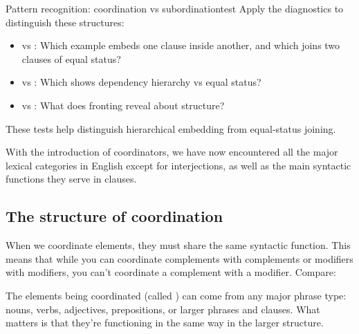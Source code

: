 \begin{tblsframedsymbol}{Pattern recognition: coordination vs subordination}{test}
Apply the diagnostics to distinguish these structures:
\begin{itemize}[noitemsep, leftmargin=*]
    \item {} vs : Which example embeds one clause inside another, and which joins two clauses of equal status?
    \item {} vs : Which shows dependency hierarchy vs equal status?
    \item {} vs : What does fronting reveal about structure?
\end{itemize}
These tests help distinguish hierarchical embedding from equal-status joining.
\end{tblsframedsymbol}

With the introduction of coordinators, we have now encountered all the major lexical categories in English except for interjections, as well as the main syntactic functions they serve in clauses.

\subsection{The structure of coordination}

When we coordinate elements, they must share the same syntactic function. This means that while you can coordinate complements with complements or modifiers with modifiers, you can't coordinate a complement with a modifier. Compare:

\ea \label{ex:coord-function}
    \z
\z
The elements being coordinated (called ) can come from any major phrase type: nouns, verbs, adjectives, prepositions, or larger phrases and clauses. What matters is that they're functioning in the same way in the larger structure.

